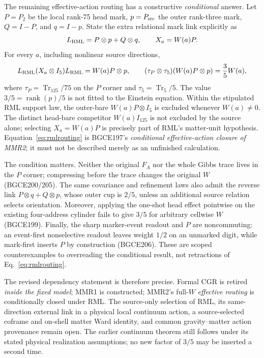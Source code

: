 \documentclass[11pt]{article}
\theoremstyle{definition}
\theoremstyle{remark}
\begin{document}
The remaining effective-action routing has a constructive \emph{conditional} answer. Let $P=P_2$ be the local rank-75 head mark, $p=P_{\rm src}$ the outer rank-three mark, $Q=I-P$, and $q=I-p$. State the extra relational mark link explicitly as
\begin{equation}\label{eq:rml}
 L_{\rm RML}=P\otimes p+Q\otimes q,
 \qquad X_a=W(a)P .
\end{equation}
For every $a$, including nonlinear source directions,
\begin{equation}\label{eq:rmlrouting}
 L_{\rm RML}(X_a\otimes I_5)L_{\rm RML}=W(a)P\otimes p,
 \qquad (\tau_P\otimes\tau_5)(W(a)P\otimes p)=\frac35 W(a),
\end{equation}
where $\tau_P=\operatorname{Tr}_{125}/75$ on the $P$ corner and $\tau_5=\operatorname{Tr}_5/5$. The value $3/5=\operatorname{rank}(p)/5$ is not fitted to the Einstein equation. Within the stipulated RML support law, the outer-bare $W(a)P\otimes I_5$ is excluded whenever $W(a)\neq0$. The distinct head-bare competitor $W(a)I_{125}$ is not excluded by the source alone; selecting $X_a=W(a)P$ is precisely part of RML's matter-unit hypothesis. Equation~\eqref{eq:rmlrouting} is BGCE197's \emph{conditional effective-action closure of MMR2}; it must not be described merely as an unfinished calculation.

The condition matters. Neither the original $F_A$ nor the whole Gibbs trace lives in the $P$ corner; compressing before the trace changes the original $W$ (BGCE200/205). The same covariance and refinement laws also admit the reverse link $P\otimes q+Q\otimes p$, whose outer cup is $2/5$, unless an additional source relation selects orientation. Moreover, applying the one-shot head effect pointwise on the existing four-address cylinder fails to give $3/5$ for arbitrary cellwise $W$ (BGCE199). Finally, the sharp marker-event readout and $P$ are noncommuting: an event-first nonselective readout leaves weight $1/2$ on an unmarked digit, while mark-first inserts $P$ by construction (BGCE206). These are scoped counterexamples to overreading the conditional result, not retractions of Eq.~\eqref{eq:rmlrouting}.

The revised dependency statement is therefore precise. Formal CGR is retired \emph{inside the fixed model}; MMR1 is constructed; MMR2's full-$W$ \emph{effective routing} is conditionally closed under RML. The source-only selection of RML, its same-direction external link in a physical local continuum action, a source-selected coframe and on-shell matter Ward identity, and common gravity--matter action provenance remain open. The earlier continuum theorem still follows under its stated physical realization assumptions; no new factor of $3/5$ may be inserted a second time.
\end{document}

